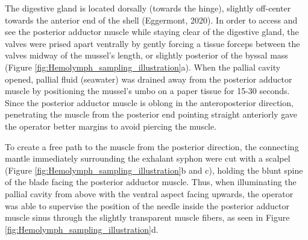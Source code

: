The digestive gland is located dorsally (towards the hinge), slightly off-center towards the anterior end of the shell (Eggermont, 2020). In order to access and see the posterior adductor muscle while staying clear of the digestive gland, the valves were prised apart ventrally by gently forcing a tissue forceps between the valves midway of the mussel's length, or slightly posterior of the byssal mass (Figure \ref{fig:Hemolymph_sampling_illustration}a). When the pallial cavity opened, pallial fluid (seawater) was drained away from the posterior adductor muscle by positioning the mussel's umbo on a paper tissue for 15-30 seconds. Since the posterior adductor muscle is oblong in the anteroposterior direction, penetrating the muscle from the posterior end pointing straight anteriorly gave the operator better margins to avoid piercing the muscle.

To create a free path to the muscle from the posterior direction, the connecting mantle immediately surrounding the exhalant syphon were cut with a scalpel (Figure \ref{fig:Hemolymph_sampling_illustration}b and c), holding the blunt spine of the blade facing the posterior adductor muscle. Thus, when illuminating the pallial cavity from above with the ventral aspect facing upwards, the operator was able to supervise the position of the needle inside the posterior adductor muscle sinus through the slightly transparent muscle fibers, as seen in Figure \ref{fig:Hemolymph_sampling_illustration}d.

